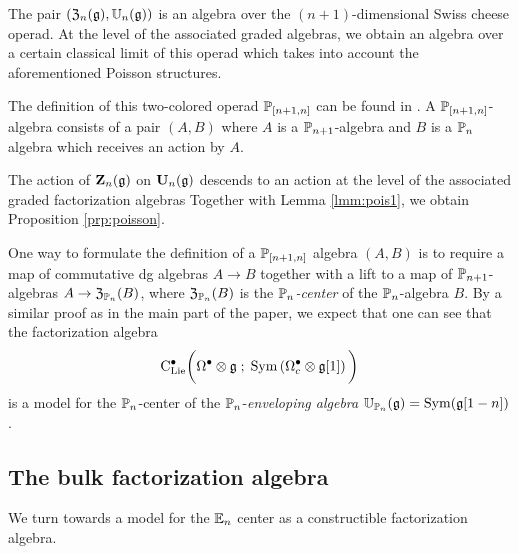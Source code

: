\documentclass[11pt]{amsart}
\numberwithin{equation}{section}
\begin{document}
The pair $(\mathfrak Z_n(\mathfrak g), \mathbb U_n(\mathfrak g))$ is an algebra over the $(n+1)$-dimensional Swiss cheese operad. 
At the level of the associated graded algebras, we obtain an algebra over a certain classical limit of this operad which takes into account the aforementioned Poisson structures.

The definition of this two-colored operad $\mathbb P_{[n+1,n]}$ can be found in \cite{SafronovCoiso}. 
A $\mathbb P_{[n+1,n]}$-algebra consists of a pair $(A,B)$ where $A$ is a $\mathbb P_{n+1}$-algebra and $B$ is a $\mathbb P_n$ algebra which receives an action by $A$. 

The action of $\mathbf Z_n(\mathfrak g)$ on $\mathbf U_n(\mathfrak g)$ descends to an action at the level of the associated graded factorization algebras
Together with Lemma \ref{lmm:pois1}, we obtain Proposition \ref{prp:poisson}. 

\begin{rmk}
One way to formulate the definition of a $\mathbb P_{[n+1,n]}$ algebra $(A,B)$ is to require a map of commutative dg algebras $A \to B$ together with a lift to a map of $\mathbb P_{n+1}$-algebras $A \to \mathfrak Z_{\mathbb P_n} (B)$, where $\mathfrak Z_{\mathbb P_n}(B)$ is the {\em $\mathbb P_n$-center} of the $\mathbb P_n$-algebra $B$. 
By a similar proof as in the main part of the paper, we expect that one can see that the factorization algebra
\[
{\rm C}_{\rm Lie}^\bullet \bigg(\Omega^\bullet \otimes \mathfrak g \; ; \; {\rm Sym} \left(\Omega^\bullet_c \otimes \mathfrak g [1] \right) \bigg)
\]
is a model for the $\mathbb P_n$-center of the $\mathbb P_n$-{\em enveloping algebra} $\mathbb U_{\mathbb P_n} (\mathfrak g) = {\rm Sym} (\mathfrak g [1-n])$. 
\end{rmk}

\subsection{The bulk factorization algebra} \label{sec:bulk}

We turn towards a model for the $\mathbb E_n$ center as a constructible factorization algebra. 
\end{document}
